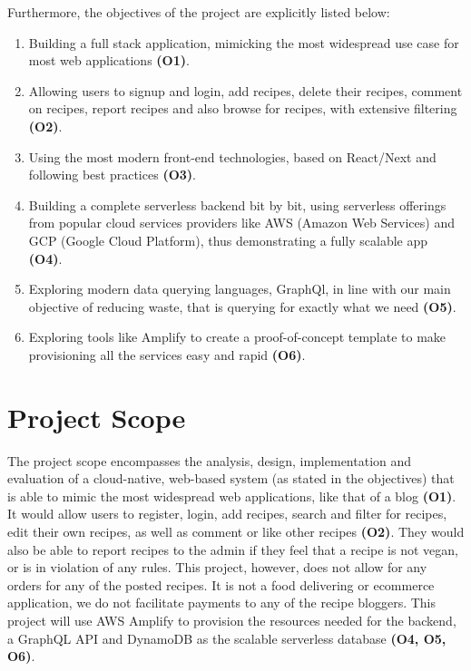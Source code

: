 Furthermore, the objectives of the project are explicitly listed below:

\begin{enumerate}[label=\arabic*.]
  \item Building a full stack application, mimicking the most widespread use case for most web applications \textbf{(O1)}.
  \item Allowing users to signup and login, add recipes, delete their recipes, comment on recipes, report recipes and also browse for recipes, with extensive filtering \textbf{(O2)}.
  \item Using the most modern front-end technologies, based on React/Next and following best practices \textbf{(O3)}.
  \item Building a complete serverless backend bit by bit, using serverless offerings from popular cloud services providers like AWS (Amazon Web Services) and GCP (Google Cloud Platform), thus demonstrating a fully scalable app \textbf{(O4)}.
  \item Exploring modern data querying languages, GraphQl, in line with our main objective of reducing waste, that is querying for exactly what we need \textbf{(O5)}.
  \item Exploring tools like Amplify to create a proof-of-concept template to make provisioning all the services easy and rapid \textbf{(O6)}.
\end{enumerate}

\section{Project Scope} 

The project scope encompasses the analysis, design, implementation and evaluation of a cloud-native, 
web-based system (as stated in the objectives) that is able to mimic the most widespread web applications, 
like that of a blog \textbf{(O1)}. It would allow users to register, login, add recipes, search and filter for recipes, 
edit their own recipes, as well as comment or like other recipes \textbf{(O2)}. They would also be able to report recipes 
to the admin if they feel that a recipe is not vegan, or is in violation of any rules. This project, however, 
does not allow for any orders for any of the posted recipes. It is not a food delivering or ecommerce application, 
we do not facilitate payments to any of the recipe bloggers. This project will use AWS Amplify to provision the 
resources needed for the backend, a GraphQL API and DynamoDB as the scalable serverless database \textbf{(O4, O5, O6)}.

